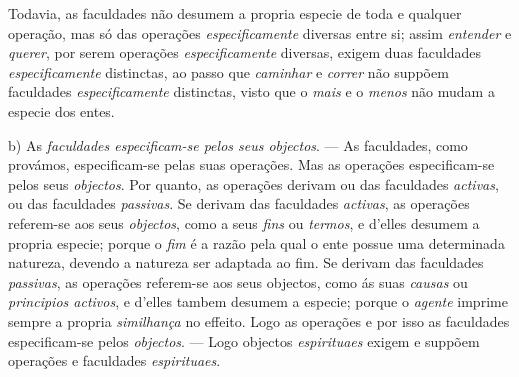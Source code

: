 Todavia, as faculdades não desumem a propria especie de toda e qualquer operação, mas só das operações \emph{especificamente} diversas entre si; assim \emph{entender} e \emph{querer}, por serem operações \emph{especificamente} diversas, exigem duas faculdades \emph{especificamente} distinctas, ao passo que \emph{caminhar} e \emph{correr} não suppõem faculdades \emph{especificamente} distinctas, visto que o \emph{mais} e o \emph{menos} não mudam a especie dos entes.

b) As \emph{faculdades especificam-se pelos seus objectos}. --- As faculdades, como provámos, especificam-se pelas suas operações. Mas as operações especificam-se pelos seus \emph{objectos}. Por quanto, as operações derivam ou das faculdades \emph{activas}, ou das faculdades \emph{passivas}. Se derivam das faculdades \emph{activas}, as operações referem-se aos seus \emph{objectos}, como a seus \emph{fins} ou \emph{termos}, e d'elles desumem a propria especie; porque o \emph{fim} é a razão pela qual o ente possue uma determinada natureza, devendo a natureza ser adaptada ao fim. Se derivam das faculdades \emph{passivas}, as operações referem-se aos seus objectos, como ás suas \emph{causas} ou \emph{principios activos}, e d'elles tambem desumem a especie; porque o \emph{agente} imprime sempre a propria \emph{similhança} no effeito. Logo as operações e por isso as faculdades especificam-se pelos \emph{objectos}. --- Logo objectos \emph{espirituaes} exigem e suppõem operações e faculdades \emph{espirituaes}.

